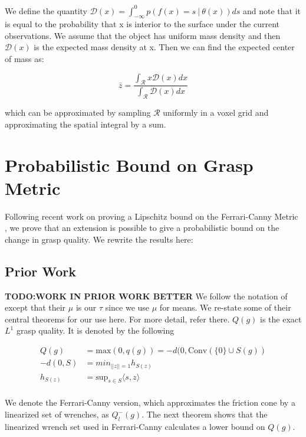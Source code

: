 \documentclass[letterpaper, 10 pt, conference]{ieeeconf}  %
\begin{document}
We define the quantity $\mathcal{D}(x) = \int_{-\infty}^{0} p(f(x) =  s \ | \ \theta(x)) ds$ and note that it is equal to the probability that x is interior to the surface under the current observations.
We assume that the object has uniform mass density and then $\mathcal{D}(x)$ is the expected mass density at x.
Then we can find the expected center of mass as:

\begin{equation}
  \bar{z} 
  =
  \frac
    {\int_{\mathcal{R}}x \mathcal{D}(x) dx}
    {\int_{\mathcal{R}}  \mathcal{D}(x) dx}
\end{equation}

which can be approximated by sampling $\mathcal{R}$ uniformly in a voxel grid and approximating the spatial integral by a sum.


\section{Probabilistic Bound on Grasp Metric}
\label{sec:bound}
Following recent work on proving a Lipschitz bound on the Ferrari-Canny Metric \cite{pokorny2013classical}, we prove that an extension is possible to give a probabilistic bound on the change in grasp quality.
We rewrite the results here:

\subsection{Prior Work}

\textbf{TODO:WORK IN PRIOR WORK BETTER}
We follow the notation of \cite{pokorny2013classical} except that their $\mu$ is our $\tau$ since we use $\mu$ for means.  
We re-state some of their central theorems for our use here.
For more detail, refer there.
$Q(g)$ is the exact $L^1$ grasp quality.
It is denoted by the following 

\begin{align}
  Q(g) &= \mbox{max}(0,q(g)) = -d(0,\mbox{Conv}(\{0\} \cup S(g))\\
-d(0,S) &= min_{||z|| = 1} h_{S(z)}\\
h_{S(z)} &= \mbox{sup}_{s\in S}\langle s,z\rangle\\
\end{align}

We denote the Ferrari-Canny version, which approximates the friction cone by a linearized set of wrenches\cite{ferrari1992}, as $Q^-_l(g)$.
The next theorem shows that the linearized wrench set used in Ferrari-Canny calculates a lower bound on $Q(g)$.\\
\end{document}
